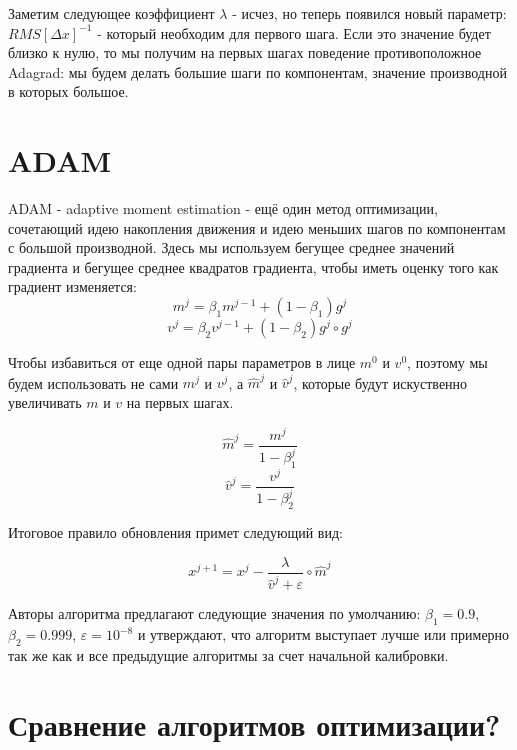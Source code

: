 \documentclass[12pt]{report}
\begin{document}
    Заметим следующее коэффициент $\lambda$ - исчез, но теперь появился новый
    параметр: $RMS[\Delta x]^{-1}$ - который необходим для первого шага. Если
    это значение будет близко к нулю, то мы получим на первых шагах поведение
    противоположное Adagrad: мы будем делать большие шаги по компонентам, значение
    производной в которых большое.

  \section{ADAM}
    ADAM - adaptive moment estimation - ещё один метод оптимизации, сочетающий
    идею накопления движения и идею меньших шагов по компонентам с большой
    производной. Здесь мы используем бегущее среднее значений градиента и бегущее
    среднее квадратов градиента, чтобы иметь оценку того как градиент изменяется:
    \begin{equation}
      m^j = \beta_1 m^{j-1} + (1 - \beta_1)g^j
    \end{equation}
    \begin{equation}
      v^j = \beta_2 v^{j-1} + (1 - \beta_2)g^j \circ g^j
    \end{equation}

    Чтобы избавиться от еще одной пары параметров в лице $m^0$ и $v^0$, поэтому
    мы будем использовать не сами $m^j$ и $v^j$, а $\hat{m}^j$ и $\hat{v}^j$,
    которые будут искуственно увеличивать $m$ и $v$ на первых шагах.

    \begin{equation}
      \hat{m}^j = \frac{m^j}{1-\beta_1^j}
    \end{equation}
    \begin{equation}
      \hat{v}^j = \frac{v^j}{1-\beta_2^j}
    \end{equation}

    Итоговое правило обновления примет следующий вид:

    \begin{equation}
      x^{j+1} = x^j - \frac{\lambda}{\hat{v}^j + \varepsilon} \circ \hat{m}^j
    \end{equation}

    Авторы алгоритма предлагают следующие значения по умолчанию: $\beta_1 = 0.9$,
    $\beta_2 = 0.999$, $\varepsilon = 10^{-8}$ и утверждают, что алгоритм выступает
    лучше или примерно так же как и все предыдущие алгоритмы за счет начальной
    калибровки.

  \section{Сравнение алгоритмов оптимизации?}
\end{document}

